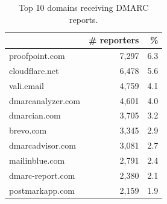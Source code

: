 \begin{table}[tb]
\footnotesize
\centering
\caption{Top 10 domains receiving DMARC reports.}
\label{tab:top_report_receivers}
\begin{tabular}{lrr}
\toprule
 & \textbf{\# reporters} & \textbf{\%} \\
\midrule
proofpoint.com & 7,297 & 6.3 \\
cloudflare.net & 6,478 & 5.6 \\
vali.email & 4,759 & 4.1 \\
dmarcanalyzer.com & 4,601 & 4.0 \\
dmarcian.com & 3,705 & 3.2 \\
brevo.com & 3,345 & 2.9 \\
dmarcadvisor.com & 3,081 & 2.7 \\
mailinblue.com & 2,791 & 2.4 \\
dmarc-report.com & 2,380 & 2.1 \\
postmarkapp.com & 2,159 & 1.9 \\
\bottomrule
\end{tabular}
\end{table}